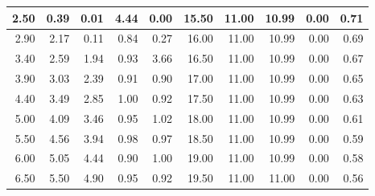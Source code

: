 \documentclass[a4paper,12pt]{article}
\begin{document}
\begin{table}[h]
{\begin{tabular}{|r|r|r|r|r|r|r|r|r|r|}
2.50                        & 0.39                        & 0.01                        & 4.44                        & 0.00
& 15.50                     & 11.00                       & 10.99                       & 0.00                        & 0.71\\ \hline
2.90                        & 2.17                        & 0.11                        & 0.84                        & 0.27
& 16.00                     & 11.00                       & 10.99                       & 0.00                        & 0.69\\ \hline
3.40                        & 2.59                        & 1.94                        & 0.93                        & 3.66
& 16.50                     & 11.00                       & 10.99                       & 0.00                        & 0.67\\ \hline
3.90                        & 3.03                        & 2.39                        & 0.91                        & 0.90
& 17.00                     & 11.00                       & 10.99                       & 0.00                        & 0.65\\ \hline
4.40                        & 3.49                        & 2.85                        & 1.00                        & 0.92
& 17.50                     & 11.00                       & 10.99                       & 0.00                        & 0.63\\ \hline
5.00                        & 4.09                        & 3.46                        & 0.95                        & 1.02
& 18.00                     & 11.00                       & 10.99                       & 0.00                        & 0.61\\ \hline
5.50                        & 4.56                        & 3.94                        & 0.98                        & 0.97
& 18.50                     & 11.00                       & 10.99                       & 0.00                        & 0.59\\ \hline
6.00                        & 5.05                        & 4.44                        & 0.90                        & 1.00
& 19.00                     & 11.00                       & 10.99                       & 0.00                        & 0.58\\ \hline
6.50                        & 5.50                        & 4.90                        & 0.95                        & 0.92
& 19.50                     & 11.00                       & 11.00                       & 0.00                        & 0.56\\ \hline

\end{tabular}}
\end{table}
\end{document}
